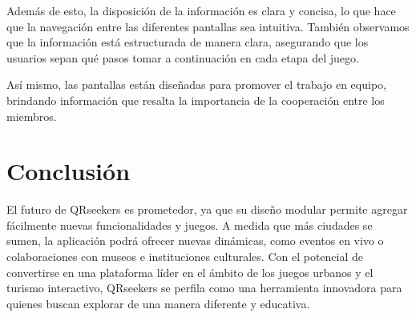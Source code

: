 \documentclass[letterpaper, 12pt]{report}
\begin{document}
Además de esto, la disposición de la información es clara y concisa, lo que hace que la navegación entre las diferentes pantallas sea intuitiva. También observamos que la información está estructurada de manera clara, asegurando que los usuarios sepan qué pasos tomar a continuación en cada etapa del juego.

Así mismo, las pantallas están diseñadas para promover el trabajo en equipo, brindando información que resalta la importancia de la cooperación entre los miembros.

\newpage

\section{Conclusión}
El futuro de QRseekers es prometedor, ya que su diseño modular permite agregar fácilmente nuevas funcionalidades y juegos. A medida que más ciudades se sumen, la aplicación podrá ofrecer nuevas dinámicas, como eventos en vivo o colaboraciones con museos e instituciones culturales. Con el potencial de convertirse en una plataforma líder en el ámbito de los juegos urbanos y el turismo interactivo, QRseekers se perfila como una herramienta innovadora para quienes buscan explorar de una manera diferente y educativa.

\newpage
\hspace{0pt} %
\end{document}
